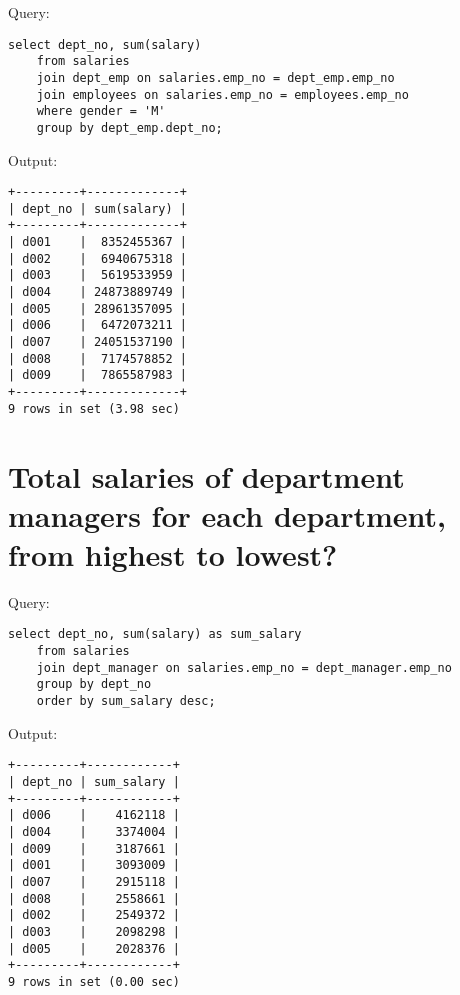\documentclass[12pt]{article}
\begin{document}
Query:

\begin{verbatim}
select dept_no, sum(salary)
    from salaries
    join dept_emp on salaries.emp_no = dept_emp.emp_no
    join employees on salaries.emp_no = employees.emp_no
    where gender = 'M'
    group by dept_emp.dept_no;
\end{verbatim}

Output:

\begin{verbatim}
+---------+-------------+
| dept_no | sum(salary) |
+---------+-------------+
| d001    |  8352455367 |
| d002    |  6940675318 |
| d003    |  5619533959 |
| d004    | 24873889749 |
| d005    | 28961357095 |
| d006    |  6472073211 |
| d007    | 24051537190 |
| d008    |  7174578852 |
| d009    |  7865587983 |
+---------+-------------+
9 rows in set (3.98 sec)
\end{verbatim}


\section{Total salaries of department managers for each department, from highest to lowest?}

Query:

\begin{verbatim}
select dept_no, sum(salary) as sum_salary
    from salaries
    join dept_manager on salaries.emp_no = dept_manager.emp_no
    group by dept_no
    order by sum_salary desc;
\end{verbatim}

Output:

\begin{verbatim}
+---------+------------+
| dept_no | sum_salary |
+---------+------------+
| d006    |    4162118 |
| d004    |    3374004 |
| d009    |    3187661 |
| d001    |    3093009 |
| d007    |    2915118 |
| d008    |    2558661 |
| d002    |    2549372 |
| d003    |    2098298 |
| d005    |    2028376 |
+---------+------------+
9 rows in set (0.00 sec)
\end{verbatim}

\end{document}
